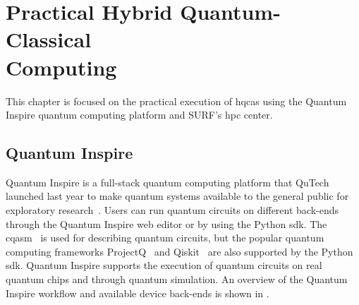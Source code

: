 \chapter[Practical Hybrid Quantum-Classical Computing]{Practical Hybrid Quantum-Classical\\Computing} \label{chap:practical-hybrid-quantum-classical-computing}
This chapter is focused on the practical execution of \glspl{hqca} using the Quantum Inspire quantum computing platform and SURF's \gls{hpc} center.

\section{Quantum Inspire}
Quantum Inspire is a full-stack quantum computing platform that QuTech launched last year to make quantum systems available to the general public for exploratory research~\cite{last2020quantum}.
Users can run quantum circuits on different back-ends through the Quantum Inspire web editor or by using the Python \gls{sdk}.
The \gls{cqasm}~\cite{khammassi2018cqasm} is used for describing quantum circuits, but the popular quantum computing frameworks ProjectQ~\cite{steiger2018projectq} and Qiskit~\cite{qiskit} are also supported by the Python \gls{sdk}.
Quantum Inspire supports the execution of quantum circuits on real quantum chips and through quantum simulation.
An overview of the Quantum Inspire workflow and available device back-ends is shown in .

